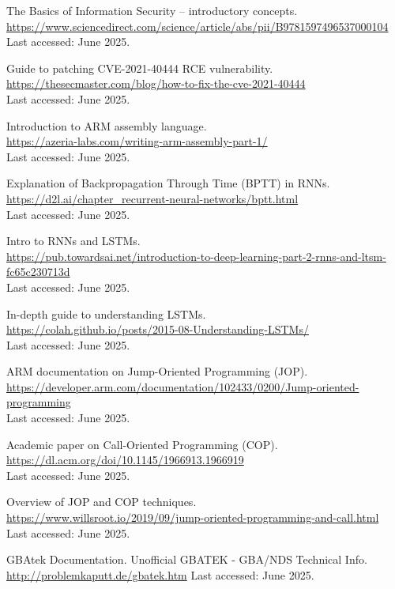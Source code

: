 \documentclass[a4paper]{usiinfbachelorproject}
\begin{document}
\begin{thebibliography}{99}
	The Basics of Information Security – introductory concepts.\\
	\url{https://www.sciencedirect.com/science/article/abs/pii/B9781597496537000104}\\
	Last accessed: June 2025.


	Guide to patching CVE-2021-40444 RCE vulnerability.\\
	\url{https://thesecmaster.com/blog/how-to-fix-the-cve-2021-40444}\\
	Last accessed: June 2025.


	Introduction to ARM assembly language.\\
	\url{https://azeria-labs.com/writing-arm-assembly-part-1/}\\
	Last accessed: June 2025.


	Explanation of Backpropagation Through Time (BPTT) in RNNs.\\
	\url{https://d2l.ai/chapter_recurrent-neural-networks/bptt.html}\\
	Last accessed: June 2025.


	Intro to RNNs and LSTMs.\\
	\url{https://pub.towardsai.net/introduction-to-deep-learning-part-2-rnns-and-ltsm-fc65c230713d}\\
	Last accessed: June 2025.


	In-depth guide to understanding LSTMs.\\
	\url{https://colah.github.io/posts/2015-08-Understanding-LSTMs/}\\
	Last accessed: June 2025.


	ARM documentation on Jump-Oriented Programming (JOP).\\
	\url{https://developer.arm.com/documentation/102433/0200/Jump-oriented-programming}\\
	Last accessed: June 2025.


	Academic paper on Call-Oriented Programming (COP).\\
	\url{https://dl.acm.org/doi/10.1145/1966913.1966919}\\
	Last accessed: June 2025.


	Overview of JOP and COP techniques.\\
	\url{https://www.willsroot.io/2019/09/jump-oriented-programming-and-call.html}\\
	Last accessed: June 2025.

	GBAtek Documentation.
	Unofficial GBATEK - GBA/NDS Technical Info.
	\url{http://problemkaputt.de/gbatek.htm}
	Last accessed: June 2025.


\end{thebibliography}
\end{document}
